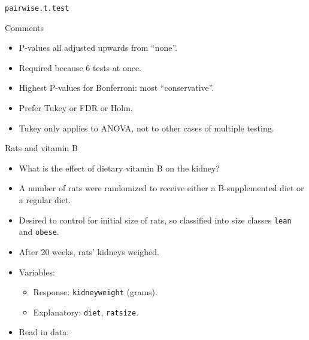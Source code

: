 \begin{frame}[fragile]{\texttt{pairwise.t.test}}
\begin{multicols}{2}
  \end{multicols}
  
\end{frame}

\begin{frame}[fragile]{Comments}
  
  \begin{itemize}
  \item P-values all adjusted upwards from ``none''.
  \item Required because 6 tests at once.
  \item Highest P-values for Bonferroni: most ``conservative''.
  \item Prefer Tukey or FDR or Holm.
  \item Tukey only applies to ANOVA, not to other cases of multiple
    testing. 
  \end{itemize}
  
\end{frame}

\begin{frame}[fragile]{Rats and vitamin B}
  
  \begin{itemize}
  \item What is the effect of dietary vitamin B on the kidney?
  \item A number of rats were randomized to receive either a
    B-supplemented diet or a regular diet.
  \item Desired to control for initial size of rats, so classified
    into size classes \texttt{lean} and \texttt{obese}.
  \item After 20 weeks, rats' kidneys weighed.
  \item Variables:
    \begin{itemize}
    \item Response: \texttt{kidneyweight} (grams).
    \item Explanatory: \texttt{diet}, \texttt{ratsize}.
    \end{itemize}
  \item Read in data:
    
\begin{knitrout}
\color{fgcolor}\begin{kframe}
\begin{alltt}
\hlkwb{=}\hlstd{(}\hlstd{,}
\end{alltt}
\end{kframe}
\end{knitrout}
  \end{itemize}
  
\end{frame}

